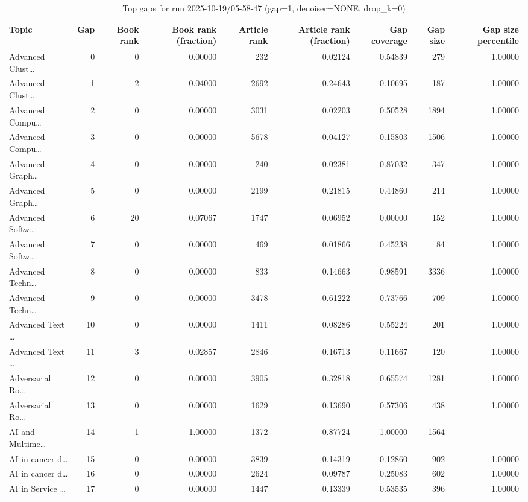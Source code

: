 \begin{table}
\caption{Top gaps for run 2025-10-19/05-58-47 (gap=1, denoiser=NONE, drop\_k=0)}
\label{tab:best_run_gap1_2025_10_19_05_58_47}
\begin{tabular}{lrrrrrrrr}
\toprule
Topic & Gap & Book rank & Book rank (fraction) & Article rank & Article rank (fraction) & Gap coverage & Gap size & Gap size percentile \\
\midrule
Advanced Clust… & 0 & 0 & 0.00000 & 232 & 0.02124 & 0.54839 & 279 & 1.00000 \\
Advanced Clust… & 1 & 2 & 0.04000 & 2692 & 0.24643 & 0.10695 & 187 & 1.00000 \\
Advanced Compu… & 2 & 0 & 0.00000 & 3031 & 0.02203 & 0.50528 & 1894 & 1.00000 \\
Advanced Compu… & 3 & 0 & 0.00000 & 5678 & 0.04127 & 0.15803 & 1506 & 1.00000 \\
Advanced Graph… & 4 & 0 & 0.00000 & 240 & 0.02381 & 0.87032 & 347 & 1.00000 \\
Advanced Graph… & 5 & 0 & 0.00000 & 2199 & 0.21815 & 0.44860 & 214 & 1.00000 \\
Advanced Softw… & 6 & 20 & 0.07067 & 1747 & 0.06952 & 0.00000 & 152 & 1.00000 \\
Advanced Softw… & 7 & 0 & 0.00000 & 469 & 0.01866 & 0.45238 & 84 & 1.00000 \\
Advanced Techn… & 8 & 0 & 0.00000 & 833 & 0.14663 & 0.98591 & 3336 & 1.00000 \\
Advanced Techn… & 9 & 0 & 0.00000 & 3478 & 0.61222 & 0.73766 & 709 & 1.00000 \\
Advanced Text … & 10 & 0 & 0.00000 & 1411 & 0.08286 & 0.55224 & 201 & 1.00000 \\
Advanced Text … & 11 & 3 & 0.02857 & 2846 & 0.16713 & 0.11667 & 120 & 1.00000 \\
Adversarial Ro… & 12 & 0 & 0.00000 & 3905 & 0.32818 & 0.65574 & 1281 & 1.00000 \\
Adversarial Ro… & 13 & 0 & 0.00000 & 1629 & 0.13690 & 0.57306 & 438 & 1.00000 \\
AI and Multime… & 14 & -1 & -1.00000 & 1372 & 0.87724 & 1.00000 & 1564 &  \\
AI in cancer d… & 15 & 0 & 0.00000 & 3839 & 0.14319 & 0.12860 & 902 & 1.00000 \\
AI in cancer d… & 16 & 0 & 0.00000 & 2624 & 0.09787 & 0.25083 & 602 & 1.00000 \\
AI in Service … & 17 & 0 & 0.00000 & 1447 & 0.13339 & 0.53535 & 396 & 1.00000 \\

\end{tabular}
\end{table}
